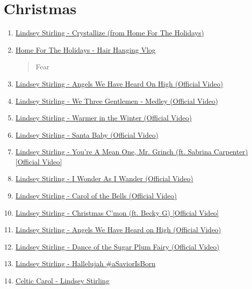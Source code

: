 \documentclass{book}
\numberwithin{equation}{section}
\begin{document}
\section{Christmas}
\begin{enumerate}
    \item \href{https://www.youtube.com/watch?v=C8md6yJkUY4}{Lindsey Stirling - Crystallize (from Home For The Holidays)}
    \item \href{https://www.youtube.com/watch?v=Aky-J-b9LcU}{Home For The Holidays - Hair Hanging Vlog}
    
    \begin{quotation}
        Fear
    \end{quotation}
    \item \href{https://www.youtube.com/watch?v=IFsDAoCHYiQ}{Lindsey Stirling - Angels We Have Heard On High (Official Video)}
    \item \href{https://www.youtube.com/watch?v=QMbyklU3rSM}{Lindsey Stirling - We Three Gentlemen - Medley (Official Video)}
    \item \href{https://www.youtube.com/watch?v=_TFwieKKEpk}{Lindsey Stirling - Warmer in the Winter (Official Video)}
    \item \href{https://www.youtube.com/watch?v=z-oxagtRO7A}{Lindsey Stirling - Santa Baby (Official Video)}
    \item \href{https://www.youtube.com/watch?v=kQb0DJZLhRM}{Lindsey Stirling - You're A Mean One, Mr. Grinch (ft. Sabrina Carpenter) [Official Video]}
    \item \href{https://www.youtube.com/watch?v=4rR8jc6EPQM}{Lindsey Stirling - I Wonder As I Wander (Official Video)}
    \item \href{https://www.youtube.com/watch?v=EKkzbbLYPuI}{Lindsey Stirling - Carol of the Bells (Official Video)}
    \item \href{https://www.youtube.com/watch?v=D-dwmYeLLng}{Lindsey Stirling - Christmas C'mon (ft. Becky G) [Official Video]}
    \item \href{https://www.youtube.com/watch?v=Na7VFFnqWVI}{Lindsey Stirling - Angels We Have Heard on High (Official Video)}
    \item \href{https://www.youtube.com/watch?v=0RkSy6ElNIY}{Lindsey Stirling - Dance of the Sugar Plum Fairy (Official Video)}
    \item \href{https://www.youtube.com/watch?v=5VzprYCxPBQ}{Lindsey Stirling - Hallelujah \#aSaviorIsBorn}
    \item \href{https://www.youtube.com/watch?v=jg4sZZaf3Gg}{Celtic Carol - Lindsey Stirling}

\end{enumerate}
\end{document}

